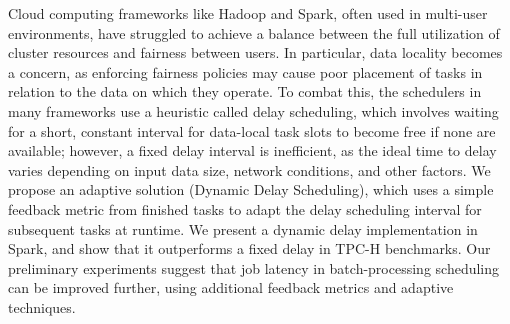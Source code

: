 
Cloud computing frameworks like Hadoop and Spark, often used in multi-user environments, 
have struggled to achieve a balance between the full utilization of cluster resources and fairness between users. 
In particular, data locality becomes a concern, as enforcing fairness policies may cause poor placement of tasks in relation to the data on which they operate. 
To combat this, the schedulers in many frameworks use a heuristic called delay scheduling, 
which involves waiting for a short, constant interval for data-local task slots to become free if none are available; 
however, a fixed delay interval is inefficient, as the ideal time to delay varies depending on input data size, network conditions, and other factors. 
We propose an adaptive solution (Dynamic Delay Scheduling), which uses a simple feedback metric from finished tasks to adapt the delay scheduling interval for 
subsequent tasks at runtime. We present a dynamic delay implementation in Spark, and show that it outperforms a fixed delay in TPC-H benchmarks. 
Our preliminary experiments suggest that job latency in batch-processing scheduling can be improved further, using additional feedback metrics and adaptive techniques.
